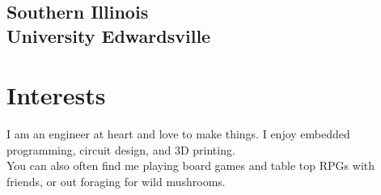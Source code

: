 \documentclass[]{deedy-resume-openfont}
\begin{document}
\begin{minipage}[t]{0.31\textwidth}
\subsection{Southern Illinois \\University Edwardsville}
\sectionsep
{}
\sectionsep


\section{Interests}
I am an engineer at heart and love to make things. I enjoy embedded programming, circuit design, and 3D printing.\\
\sectionsep
You can also often find me playing board games and table top RPGs with friends, or out foraging for wild mushrooms.



%
%

\end{minipage} 
\hfill
\end{document}
